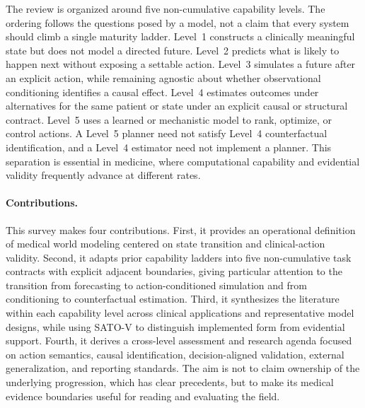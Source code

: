 The review is organized around five non-cumulative capability levels. The ordering follows the questions posed by a model, not a claim that every system should climb a single maturity ladder. Level~1 constructs a clinically meaningful state but does not model a directed future. Level~2 predicts what is likely to happen next without exposing a settable action. Level~3 simulates a future after an explicit action, while remaining agnostic about whether observational conditioning identifies a causal effect. Level~4 estimates outcomes under alternatives for the same patient or state under an explicit causal or structural contract. Level~5 uses a learned or mechanistic model to rank, optimize, or control actions. A Level~5 planner need not satisfy Level~4 counterfactual identification, and a Level~4 estimator need not implement a planner. This separation is essential in medicine, where computational capability and evidential validity frequently advance at different rates.

\paragraph{Contributions.} This survey makes four contributions. First, it provides an operational definition of medical world modeling centered on state transition and clinical-action validity. Second, it adapts prior capability ladders into five non-cumulative task contracts with explicit adjacent boundaries, giving particular attention to the transition from forecasting to action-conditioned simulation and from conditioning to counterfactual estimation. Third, it synthesizes the literature within each capability level across clinical applications and representative model designs, while using SATO-V to distinguish implemented form from evidential support. Fourth, it derives a cross-level assessment and research agenda focused on action semantics, causal identification, decision-aligned validation, external generalization, and reporting standards. The aim is not to claim ownership of the underlying progression, which has clear precedents, but to make its medical evidence boundaries useful for reading and evaluating the field.

